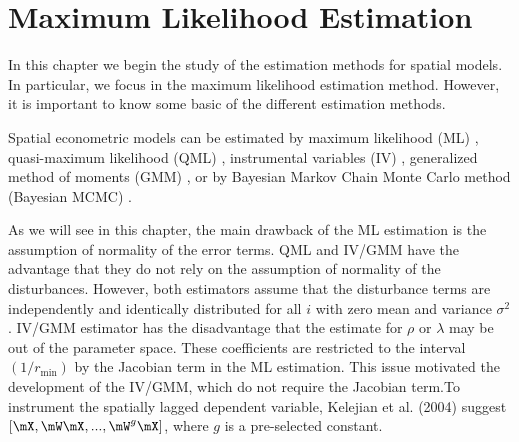 \documentclass[english,12pt]{book}\usepackage[]{graphicx}\usepackage[]{xcolor}
\begin{document}
\chapter{Maximum Likelihood Estimation}\label{chap:ML}

In this chapter we begin the study of the estimation methods for spatial models. In particular, we focus in the maximum likelihood estimation method. However, it is important to know some basic of the different estimation methods. 

Spatial econometric models can be estimated by maximum likelihood (ML) \citep{ord1975estimation}, quasi-maximum likelihood (QML) \citep{lee2004asymptotic}, instrumental variables (IV) \citep[][pp. 82-86]{anselin1988spatial}, generalized method of moments (GMM) \citep{kelejian1998generalized, kelejian1999generalized}, or by Bayesian Markov Chain Monte Carlo method (Bayesian MCMC) \citep{lesage1997bayesian}.

As we will see in this chapter, the main drawback of the ML estimation is the assumption of normality of the error terms. QML and IV/GMM have the advantage that they do not rely on the assumption of normality of the disturbances. However, both estimators assume that the disturbance terms are independently and identically distributed for all $i$ with zero mean and variance $\sigma^2$.  IV/GMM estimator has the disadvantage that the estimate for $\rho$ or $\lambda$ may be out of the parameter space. These coefficients are restricted to the interval $(1/r_{\mbox{min}})$ by the Jacobian term in the ML estimation. This issue motivated the development of the IV/GMM, which do not require the Jacobian term.To instrument the spatially lagged dependent variable, Kelejian et al. (2004) suggest $\left[\mX, \mW\mX,...,\mW^g\mX\right]$, where $g$ is a pre-selected constant. 





\end{document}
